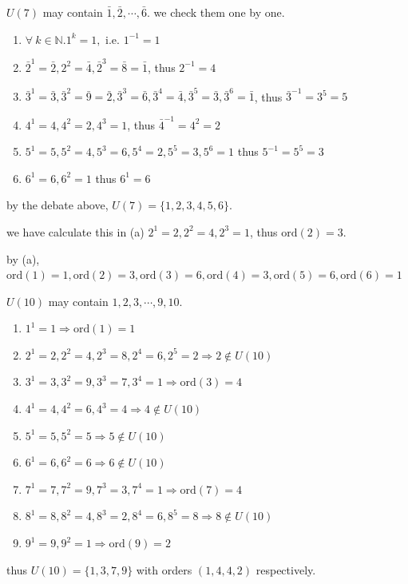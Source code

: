 \documentclass[11pt]{homework}
\newcommand{\N}{\mathbb{N}}
\newcommand{\fal}{\forall\ }
\newcommand{\ie}{\text{ i.e. }}
\newcommand{\ord}{\mathrm{ord}}
\begin{document}
\question
\begin{alphaparts}
    \questionpart $U(7)$ may contain $\bar{1},\bar{2},\cdots,\bar{6}$. we check them one by one.
    \begin{enumerate}[label=\protect\textcircled{\tiny\arabic*}]
        \item $\fal k\in\N. 1^k=1, \ie 1^{-1}=1$
        \item $\bar{2}^1=\bar{2},2^2=\bar{4},\bar{2}^3=\bar{8}=\bar{1} $, thus $2^{-1}=4$
        \item $\bar{3}^1=\bar{3},\bar{3}^2=\bar{9}=\bar{2},\bar{3}^3=\bar{6},\bar{3}^4=\bar{4},\bar{3}^5=\bar{3}, \bar{3}^6=\bar{1}$, thus $\bar{3}^{-1}=3^5=5$
        \item $4^1=4,4^2=2,4^3=1$, thus $\bar{4}^{-1}=4^2=2$
        \item $5^1=5,5^2=4,5^3=6,5^4=2,5^5=3,5^6=1$ thus $5^{-1}=5^5=3$
        \item $6^1=6,6^2=1$ thus $6^1=6$
    \end{enumerate}
    by the debate above, $U(7)=\{1,2,3,4,5,6\}$.

    \questionpart we have calculate this in (a) $2^1=2,2^2=4,2^3=1$, thus $\ord(2)=3$.

    \questionpart by (a), $\ord(1)=1,\ord(2)=3,\ord(3)=6,\ord(4)=3,\ord(5)=6,\ord(6)=1$

    \questionpart $U(10)$ may contain $1,2,3,\cdots,9,10$.
    \begin{enumerate}[label=\protect\textcircled{\tiny\arabic*}]
        \item $1^1=1 \Rightarrow \ord(1)=1$
        \item $2^1=2,2^2=4,2^3=8,2^4=6,2^5=2 \Rightarrow 2 \notin U(10) $
        \item $3^1=3,3^2=9,3^3=7,3^4=1 \Rightarrow \ord(3)=4$
        \item $4^1=4,4^2=6,4^3=4 \Rightarrow 4 \notin U(10)$
        \item $5^1=5,5^2=5 \Rightarrow 5 \notin U(10)$
        \item $6^1=6,6^2=6 \Rightarrow 6 \notin U(10)$
        \item $7^1=7,7^2=9,7^3=3,7^4=1 \Rightarrow \ord(7)=4$
        \item $8^1=8,8^2=4,8^3=2,8^4=6,8^5=8 \Rightarrow 8\notin U(10)$
        \item $9^1=9,9^2=1 \Rightarrow \ord(9)=2$
    \end{enumerate}
    thus $U(10)=\{1,3,7,9\}$ with orders $(1,4,4,2)$ respectively.


\end{alphaparts}
\end{document}
